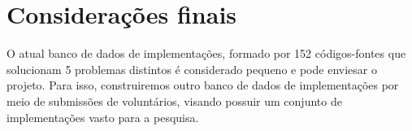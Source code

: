 	\section{Considerações finais}
	
		O atual banco de dados de implementações, formado por 152 códigos-fontes que
		solucionam 5 problemas distintos é considerado pequeno e pode enviesar o
		projeto. Para isso, construiremos outro banco de dados de implementações
		por meio de submissões de voluntários, visando possuir um conjunto de
		implementações vasto para a pesquisa.
